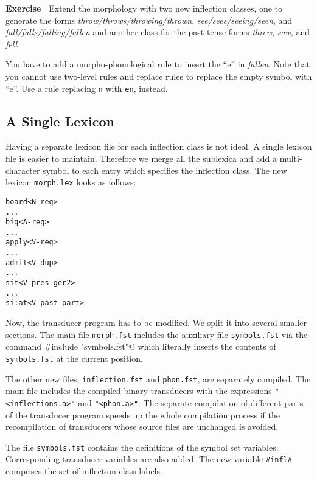 \documentclass[11pt]{article}
\newenvironment{exercise}{

  \hrulefill\nopagebreak

  \textbf{Exercise~}}
{

  \nopagebreak\hrulefill\vspace{0.2cm}

}
\begin{document}
\begin{exercise}
  Extend the morphology with two new inflection classes, one to
  generate the forms \emph{throw/throws/throwing/thrown},
  \emph{see/sees/seeing/seen}, and \emph{fall/falls/falling/fallen}
  and another class for the past tense forms \emph{threw}, \emph{saw},
  and \emph{fell}. 
  
  You have to add a morpho-phonological rule to insert the ``e'' in
  \emph{fallen}. Note that you cannot use two-level rules and replace
  rules to replace the empty symbol with ``e''. Use a rule replacing
  \texttt{n} with \texttt{en}, instead.
\end{exercise}


\subsection{A Single Lexicon}

Having a separate lexicon file for each inflection class is not ideal.
A single lexicon file is easier to maintain. Therefore we merge all
the sublexica and add a multi-character symbol to each entry which
specifies the inflection class. The new lexicon \texttt{morph.lex} looks
as follows:

\begin{verbatim}
board<N-reg>
...
big<A-reg>
...
apply<V-reg>
...
admit<V-dup>
...
sit<V-pres-ger2>
...
si:at<V-past-part>
\end{verbatim}

Now, the transducer program has to be modified. We split it into
several smaller sections. The main file \texttt{morph.fst} includes
the auxiliary file \texttt{symbols.fst} via the command
\verb@#include "symbols.fst"@ which literally inserts the contents of
\texttt{symbols.fst} at the current position.

The other new files, \texttt{inflection.fst} and \texttt{phon.fst},
are separately compiled.  The main file includes the compiled binary
transducers with the expressions \verb#"<inflections.a>"# and
\verb#"<phon.a>"#. The separate compilation of different parts of the
transducer program speeds up the whole compilation process if the
recompilation of transducers whose source files are unchanged is
avoided.

The file \texttt{symbols.fst} contains the definitions of the symbol
set variables. Corresponding transducer variables are also 
added. The new variable \texttt{\#infl\#} comprises the set of
inflection class labels.
\end{document}
